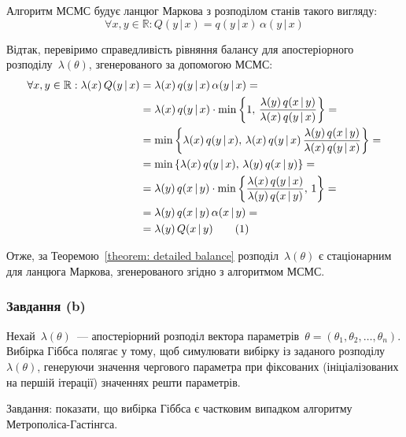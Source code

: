 \documentclass{mathreport}
\begin{document}
Алгоритм МСМС будує ланцюг Маркова з розподілом станів такого вигляду:
\begin{equation}
    \forall x,y \in \mathbb{R}: Q(y\, |\, x) = q(y\, |\, x)\,\alpha(y\, |\, x)
\end{equation}

Відтак, перевіримо справедливість рівняння балансу для апостеріорного розподілу~$\lambda(\theta)$, згенерованого за допомогою МСМС:
\begin{align*}
    \forall x,y \in \mathbb{R}: \lambda(x)\,Q(y\, |\, x) 
        & = \lambda(x)\,q(y\, |\, x)\,\alpha(y\, |\, x) = \\
        & = \lambda(x)\,q(y\, |\, x) \cdot \min\left\{ 
            1,\, \frac{\lambda(y)\,q(x\, |\, y)}{\lambda(x)\,q(y\, |\, x)} 
        \right\} = \\
        & = \min\left\{ 
            \lambda(x)\,q(y\, |\, x),\, \lambda(x)\,q(y\, |\, x)\,\frac{\lambda(y)\,q(x\, |\, y)}{\lambda(x)\, q(y\, |\, x)}
        \right\} = \\
        & = \min\left\{ 
            \lambda(x)\,q(y\, |\, x),\, \lambda(y)\,q(x\, |\, y)
        \right\} = \\
        & = \lambda(y)\,q(x\, |\, y) \cdot \min\left\{ 
            \frac{\lambda(x)\,q(y\, |\, x)}{\lambda(y)\,q(x\, |\, y)},\, 1
        \right\} = \\
        & = \lambda(y)\,q(x\, |\, y)\,\alpha(x\, |\, y) = \\
        & = \lambda(y)\,Q(x\, |\, y) \stepcounter{equation}\tag{\theequation}
\end{align*}

Отже, за Теоремою~\ref{theorem: detailed balance} розподіл~$\lambda(\theta)$ є стаціонарним для ланцюга Маркова, згенерованого згідно з алгоритмом МСМС.

\subsubsection*{Завдання (b)}

Нехай~$\lambda(\theta)$~--- апостеріорний розподіл вектора параметрів~$\theta=(\theta_1,\theta_2,\ldots,\theta_n)$. Вибірка Гіббса полягає у тому, щоб симулювати вибірку із заданого розподілу~$\lambda(\theta)$, генеруючи значення чергового параметра при фіксованих (ініціалізованих на першій ітерації) значеннях решти параметрів.

Завдання: показати, що вибірка Гіббса є частковим випадком алгоритму Метрополіса-Гастінгса.
\end{document}
